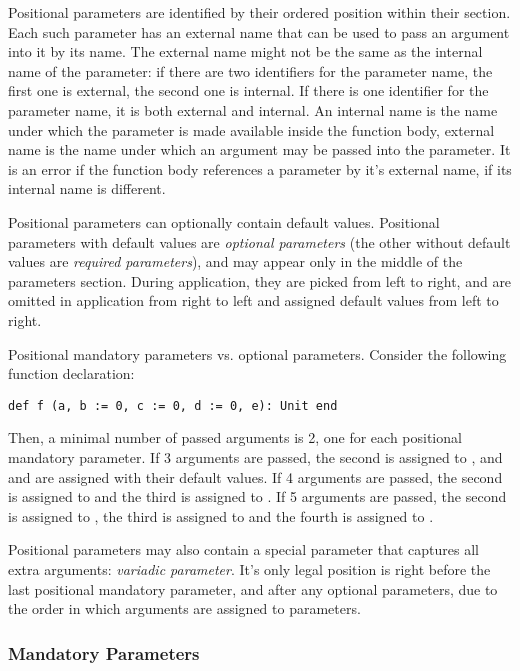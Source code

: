 Positional parameters are identified by their ordered position within their section. Each such parameter has an external name that can be used to pass an argument into it by its name. The external name might not be the same as the internal name of the parameter: if there are two identifiers for the parameter name, the first one is external, the second one is internal. If there is one identifier for the parameter name, it is both external and internal. An internal name is the name under which the parameter is made available inside the function body, external name is the name under which an argument may be passed into the parameter. It is an error if the function body references a parameter by it's external name, if its internal name is different. 

Positional parameters can optionally contain default values. Positional parameters with default values are {\em optional parameters} (the other without default values are {\em required parameters}), and may appear only in the middle of the parameters section. During application, they are picked from left to right, and are omitted in application from right to left and assigned default values from left to right.

\example Positional mandatory parameters vs. optional parameters. Consider the following function declaration:
\begin{lstlisting}
def f (a, b := 0, c := 0, d := 0, e): Unit end
\end{lstlisting}

Then, a minimal number of passed arguments is 2, one for each positional mandatory parameter. If 3 arguments are passed, the second is assigned to , and  and  are assigned with their default values. If 4 arguments are passed, the second is assigned to  and the third is assigned to . If 5 arguments are passed, the second is assigned to , the third is assigned to  and the fourth is assigned to .

Positional parameters may also contain a special parameter that captures all extra arguments: {\em variadic parameter}. It's only legal position is right before the last positional mandatory parameter, and after any optional parameters, due to the order in which arguments are assigned to parameters. 





\subsubsection{Mandatory Parameters}
\label{sec:mandatory-parameters}

